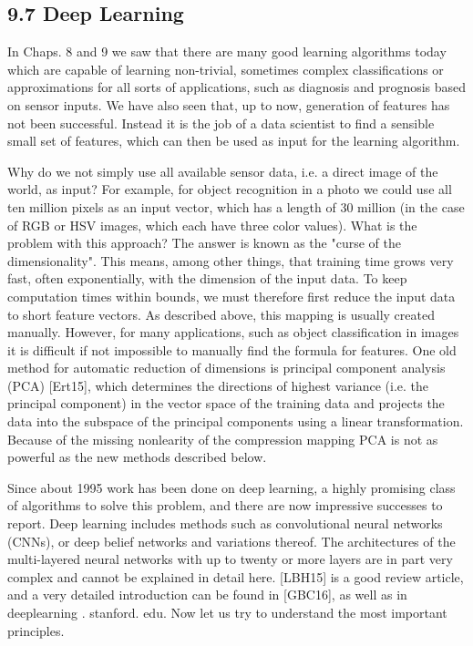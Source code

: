 \documentclass[10pt]{book}
\begin{document}
\begin{center}
\begin{enumerate}
\begin{center}
\begin{center}
\begin{center}
\subsection*{9.7 Deep Learning}
In Chaps. 8 and 9 we saw that there are many good learning algorithms today which are capable of learning non-trivial, sometimes complex classifications or approximations for all sorts of applications, such as diagnosis and prognosis based on sensor inputs. We have also seen that, up to now, generation of features has not been successful. Instead it is the job of a data scientist to find a sensible small set of features, which can then be used as input for the learning algorithm.

Why do we not simply use all available sensor data, i.e. a direct image of the world, as input? For example, for object recognition in a photo we could use all ten million pixels as an input vector, which has a length of 30 million (in the case of RGB or HSV images, which each have three color values). What is the problem with this approach? The answer is known as the "curse of the dimensionality". This means, among other things, that training time grows very fast, often exponentially, with the dimension of the input data. To keep computation times within bounds, we must therefore first reduce the input data to short feature vectors. As described above, this mapping is usually created manually. However, for many applications, such as object classification in images it is difficult if not impossible to manually find the formula for features. One old method for automatic reduction of dimensions is principal component analysis (PCA) [Ert15], which determines the directions of highest variance (i.e. the principal component) in the vector space of the training data and projects the data into the subspace of the principal components using a linear transformation. Because of the missing nonlearity of the compression mapping PCA is not as powerful as the new methods described below.

Since about 1995 work has been done on deep learning, a highly promising class of algorithms to solve this problem, and there are now impressive successes to report. Deep learning includes methods such as convolutional neural networks (CNNs), or deep belief networks and variations thereof. The architectures of the multi-layered neural networks with up to twenty or more layers are in part very complex and cannot be explained in detail here. [LBH15] is a good review article, and a very detailed introduction can be found in [GBC16], as well as in deeplearning . stanford. edu. Now let us try to understand the most important principles.


\end{center}
\end{center}
\end{center}
\end{enumerate}
\end{center}
\end{document}
